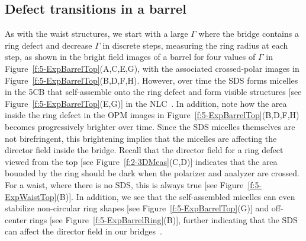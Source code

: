 \subsection{Defect transitions in a barrel}
As with the waist structures, we start with a large $\Gamma$ where the bridge contains a ring defect and decrease $\Gamma$ in discrete steps, measuring the ring radius at each step, as shown in the bright field images of a barrel for four values of $\Gamma$ in Figure~\ref{f:5-ExpBarrelTop}(A,C,E,G), with the associated crossed-polar images in Figure~\ref{f:5-ExpBarrelTop}(B,D,F,H).
However, over time the SDS forms micelles in the 5CB that self-assemble onto the ring defect and form visible structures [see Figure~\ref{f:5-ExpBarrelTop}(E,G)] in the NLC~\cite{RN279}.
In addition, note how the area inside the ring defect in the OPM images in Figure~\ref{f:5-ExpBarrelTop}(B,D,F,H) becomes progressively brighter over time.
Since the SDS micelles themselves are not birefringent, this brightening implies that the micelles are affecting the director field inside the bridge.
Recall that the director field for a ring defect viewed from the top [see Figure~\ref{f:2-3DMeas}(C,D)] indicates that the area bounded by the ring should be dark when the polarizer and analyzer are crossed.
For a waist, where there is no SDS, this is always true [see Figure~\ref{f:5-ExpWaistTop}(B)].
In addition, we see that the self-assembled micelles can even stabilize non-circular ring shapes [see Figure~\ref{f:5-ExpBarrelTop}(G)] and off-center rings [see Figure~\ref{f:5-ExpBarrelRing}(B)], further indicating that the SDS can affect the director field in our bridges~\cite{RN279,RN280}.

